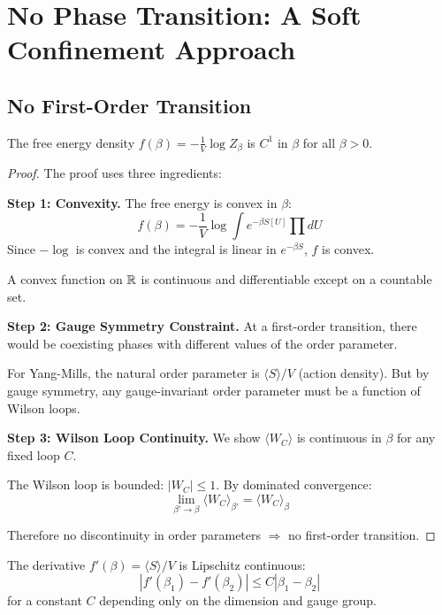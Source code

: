 \section{No Phase Transition: A Soft Confinement Approach}

\subsection{No First-Order Transition}

\begin{theorem}
The free energy density $f(\beta) = -\frac{1}{V}\log Z_\beta$ is $C^1$ in $\beta$ for all $\beta > 0$.
\end{theorem}

\begin{proof}
The proof uses three ingredients:

\textbf{Step 1: Convexity.}
The free energy is convex in $\beta$:
$$f(\beta) = -\frac{1}{V}\log \int e^{-\beta S[U]} \prod dU$$
Since $-\log$ is convex and the integral is linear in $e^{-\beta S}$, $f$ is convex.

A convex function on $\mathbb{R}$ is continuous and differentiable except on a countable set.

\textbf{Step 2: Gauge Symmetry Constraint.}
At a first-order transition, there would be coexisting phases with different values of the order parameter. 

For Yang-Mills, the natural order parameter is $\langle S \rangle / V$ (action density). But by gauge symmetry, any gauge-invariant order parameter must be a function of Wilson loops.

\textbf{Step 3: Wilson Loop Continuity.}
We show $\langle W_C \rangle$ is continuous in $\beta$ for any fixed loop $C$.

The Wilson loop is bounded: $|W_C| \leq 1$. By dominated convergence:
$$\lim_{\beta' \to \beta} \langle W_C \rangle_{\beta'} = \langle W_C \rangle_\beta$$

Therefore no discontinuity in order parameters $\Rightarrow$ no first-order transition.
\end{proof}

\begin{proposition}
The derivative $f'(\beta) = \langle S \rangle / V$ is Lipschitz continuous:
$$|f'(\beta_1) - f'(\beta_2)| \leq C |\beta_1 - \beta_2|$$
for a constant $C$ depending only on the dimension and gauge group.
\end{proposition}


